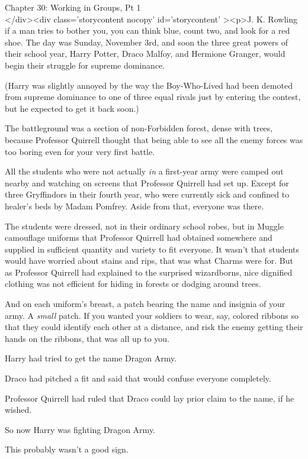 
Chapter 30: Working in Groups, Pt 1\\
</div><div  class='storycontent nocopy' id='storycontent' ><p>J. K. Rowling if 
a man tries to bother you, you can think blue, count two, and look for a red 
shoe.
\sbreak
The day was Sunday, November 3rd, and soon the three great powers of their 
school year, Harry Potter, Draco Malfoy, and Hermione Granger, would begin 
their struggle for supreme dominance.

(Harry was slightly annoyed by the way the Boy-Who-Lived had been demoted from 
supreme dominance to one of three equal rivals just by entering the contest, 
but he expected to get it back soon.)

The battleground was a section of non-Forbidden forest, dense with trees, 
because Professor Quirrell thought that being able to see all the enemy forces 
was too boring even for your very first battle.

All the students who were not actually \emph{in} a first-year army were camped 
out nearby and watching on screens that Professor Quirrell had set up. Except 
for three Gryffindors in their fourth year, who were currently sick and 
confined to healer's beds by Madam Pomfrey. Aside from that, everyone was there.

The students were dressed, not in their ordinary school robes, but in Muggle 
camouflage uniforms that Professor Quirrell had obtained somewhere and supplied 
in sufficient quantity and variety to fit everyone. It wasn't that students 
would have worried about stains and rips, that was what Charms were for. But as 
Professor Quirrell had explained to the surprised wizardborns, nice dignified 
clothing was not efficient for hiding in forests or dodging around trees.

And on each uniform's breast, a patch bearing the name and insignia of your 
army. A \emph{small} patch. If you wanted your soldiers to wear, say, colored 
ribbons so that they could identify each other at a distance, and risk the 
enemy getting their hands on the ribbons, that was all up to you.

Harry had tried to get the name Dragon Army.

Draco had pitched a fit and said that would confuse everyone completely.

Professor Quirrell had ruled that Draco could lay prior claim to the name, if 
he wished.

So now Harry was fighting Dragon Army.

This probably wasn't a good sign.

